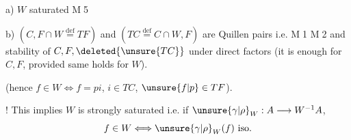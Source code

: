 a) $W$ saturated  \textcircled{M5}


b) $(C,F\cap W\overset{\mathrm{def}}{=}TF)$ and $(TC\overset{\mathrm{def}}{=}C\cap W,F)$ are Quillen pairs i.e. \textcircled{M1} \textcircled{M2} and stability of $C,F,\deleted{\unsure{TC}}$    under direct factors (it is enough for $C,F$, provided same holds for \textcircled{$W$}).



(hence  $f\in W\Longleftrightarrow f=pi$, $i\in TC$, $\unsure{f|p}\in TF$).

! This implies $W$ is strongly saturated i.e. if $\unsure{\gamma|\rho}_W:A\longrightarrow W^{-1}A$,
\[
f\in W\Longleftrightarrow\unsure{\gamma|\rho}_W(f)\text{ iso}.
\]



